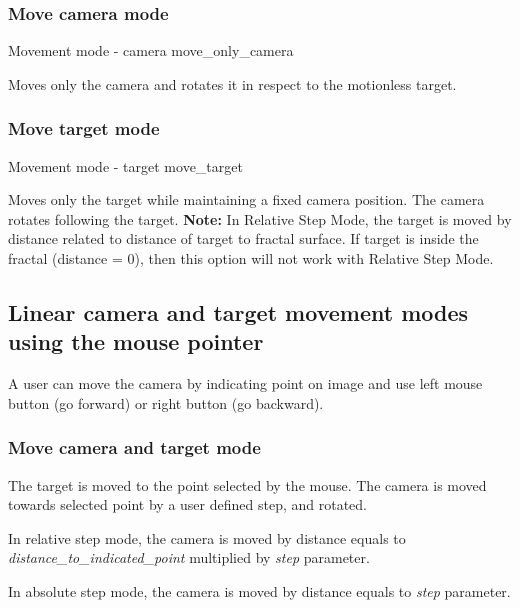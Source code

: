 \subsubsection{Move camera mode}\label{move-camera-mode}

{Movement mode - camera}
{move_only_camera}

Moves only the camera and rotates it in respect to the motionless target.

\subsubsection{Move target mode}\label{move-target-mode}

{Movement mode - target}
{move_target}

Moves only the target while maintaining a fixed camera position. The camera
rotates following the target. \textbf{Note:} In Relative Step Mode, the target
is moved by distance related to distance of target to fractal surface. If target
is inside the fractal (distance = 0), then this option will not work with
Relative Step Mode.

\subsection{Linear camera and target movement modes using the mouse
	pointer}\label{linear-camera-and-target-movement-modes-using-the-mouse-pointer}

A user can move the camera by indicating point on image and use left mouse
button (go forward) or right button (go backward).


\subsubsection{Move camera and target mode}\label{move-camera-and-target-mode-1}

The target is moved to the point selected by the mouse. The camera is moved
towards selected point by a user defined step, and rotated.

In relative step mode, the camera is moved by distance equals to
\emph{distance\_to\_indicated\_point} multiplied by \emph{step} parameter.

In absolute step mode, the camera is moved by distance equals to \emph{step}
parameter.

